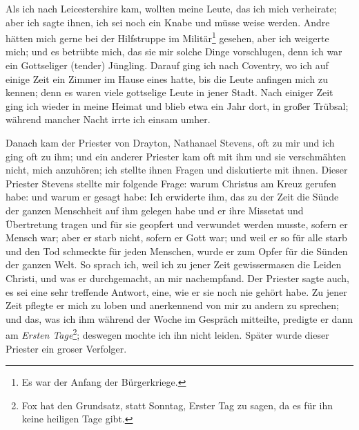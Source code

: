 Als ich nach Leicestershire kam, wollten meine Leute, das ich
mich verheirate; aber ich sagte ihnen, 
ich sei noch ein Knabe und
müsse weise werden. Andre hätten mich gerne bei der Hilfstruppe
im Militär\footnote{Es war der Anfang der Bürgerkriege.}
gesehen, aber ich weigerte mich; und es betrübte mich,
das sie mir solche Dinge vorschlugen, denn ich war ein Gottseliger
(tender) Jüngling. Darauf ging ich nach Coventry, wo ich auf
einige Zeit ein Zimmer im Hause eines  hatte, bis
die Leute anfingen mich zu kennen; denn es waren viele gottselige 
Leute in jener Stadt. Nach einiger Zeit ging ich wieder
in meine Heimat und blieb etwa ein Jahr dort, in großer Trübsal; 
während mancher Nacht irrte ich einsam umher.

Danach kam der Priester von Drayton, Nathanael 
Stevens,
oft zu mir und ich ging oft zu ihm; und ein anderer Priester
kam oft mit ihm und sie verschmähten nicht, mich anzuhören; ich
stellte ihnen Fragen und diskutierte mit ihnen. Dieser Priester
Stevens stellte mir folgende Frage: warum Christus am Kreuz
gerufen habe:  
und warum er gesagt habe:  Ich erwiderte ihm, das zu der Zeit die Sünde der
ganzen Menschheit auf ihm gelegen habe und er ihre Missetat
und Übertretung tragen und für sie geopfert und verwundet
werden musste, sofern er Mensch war; aber er starb nicht, sofern
er Gott war; und weil er so für alle starb und den Tod schmeckte
für jeden Menschen, wurde er zum Opfer für die Sünden der
ganzen Welt. So sprach ich, weil ich zu jener Zeit gewissermasen 
die Leiden Christi, und was er durchgemacht, an mir
nachempfand. Der Priester sagte auch, es sei eine sehr treffende
Antwort, eine, wie er sie noch nie gehört habe. Zu jener Zeit
pflegte er mich zu loben und anerkennend von mir zu andern zu
sprechen; und das, was ich ihm während der Woche im Gespräch
mitteilte, predigte er dann am \textit{Ersten Tage}\footnote{Fox 
hat den Grundsatz, statt Sonntag, Erster Tag zu sagen, da es für
ihn keine heiligen Tage gibt.}; deswegen mochte
ich ihn nicht leiden. Später wurde dieser Priester ein groser
Verfolger.

